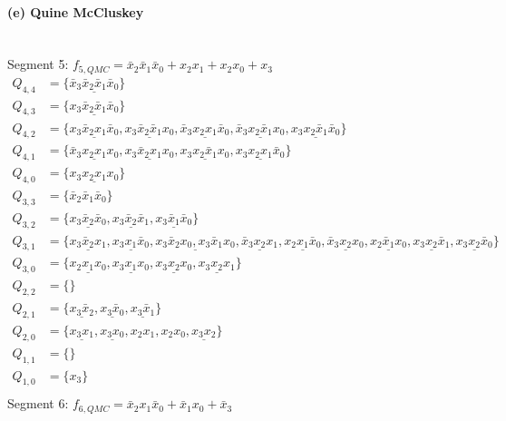 \documentclass[a4paper]{article}
\begin{document}
\paragraph{(e) Quine McCluskey}\mbox{}\\
Segment 5: $f_{5,QMC} = \bar{x}_2\bar{x}_1\bar{x}_0 + x_2x_1 + x_2x_0 + x_3$
\begin{align*}
	Q_{4,4} &= \{\underline{\bar{x}_3\bar{x}_2\bar{x}_1\bar{x}_0}\}\\
	Q_{4,3} &= \{\underline{x_3\bar{x}_2\bar{x}_1\bar{x}_0}\}\\
	Q_{4,2} &= \{\underline{x_3\bar{x}_2x_1\bar{x}_0}, \underline{x_3\bar{x}_2\bar{x}_1x_0}, \underline{\bar{x}_3x_2x_1\bar{x}_0}, \underline{\bar{x}_3x_2\bar{x}_1x_0}, \underline{x_3x_2\bar{x}_1\bar{x}_0}\}\\
	Q_{4,1} &= \{\underline{\bar{x}_3x_2x_1x_0}, \underline{x_3\bar{x}_2x_1x_0}, \underline{x_3x_2\bar{x}_1x_0}, \underline{x_3x_2x_1\bar{x}_0}\}\\
	Q_{4,0} &= \{\underline{x_3x_2x_1x_0}\}\\
	\hline
	Q_{3,3} &= \{\bar{x}_2\bar{x}_1\bar{x}_0\}\\
	Q_{3,2} &= \{\underline{x_3\bar{x}_2\bar{x}_0}, \underline{x_3\bar{x}_2\bar{x}_1}, \underline{x_3\bar{x}_1\bar{x}_0}\}\\
	Q_{3,1} &= \{\underline{x_3\bar{x}_2x_1}, \underline{x_3x_1\bar{x}_0}, \underline{x_3\bar{x}_2x_0, x_3\bar{x}_1x_0}, \underline{\bar{x}_3x_2x_1}, \underline{x_2x_1\bar{x}_0}, \underline{\bar{x}_3x_2x_0}, \underline{x_2\bar{x}_1x_0}, \underline{x_3x_2\bar{x}_1}, \underline{x_3x_2\bar{x}_0}\}\\
	Q_{3,0} &= \{\underline{x_2x_1x_0}, \underline{x_3x_1x_0}, \underline{x_3x_2x_0}, \underline{x_3x_2x_1}\}\\
	\hline
	Q_{2,2} &= \{ \}\\
	Q_{2,1} &= \{\underline{x_3\bar{x}_2}, \underline{x_3\bar{x}_0}, \underline{x_3\bar{x}_1}\}\\
	Q_{2,0} &= \{\underline{x_3x_1}, \underline{x_3x_0}, x_2x_1, x_2x_0, \underline{x_3x_2}\}\\
	\hline
	Q_{1,1} &= \{ \}\\
	Q_{1,0} &= \{x_3\}\\
\end{align*}
Segment 6: $f_{6,QMC} = \bar{x}_2x_1\bar{x}_0 + \bar{x}_1x_0 +\bar{x}_3$
\end{document}
